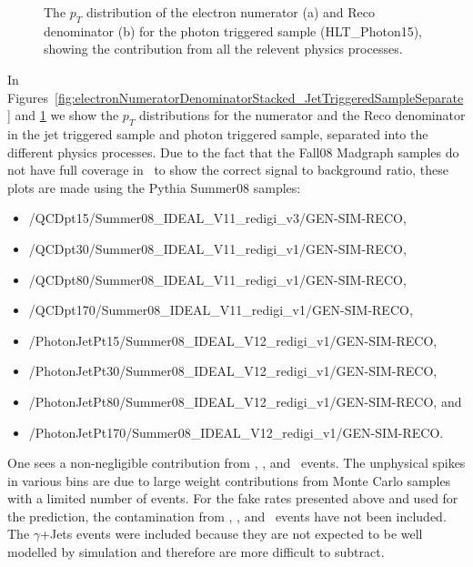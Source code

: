 \documentclass{cmspaper}
\begin{document}
\begin{figure}[htb]
  \begin{center}
    
    \caption{The $p_T$ distribution of the electron numerator (a) and Reco denominator (b) for the photon triggered sample (HLT\_Photon15), showing the contribution from all the relevent physics processes.}
    \label{fig:electronNumeratorDenominatorStacked_PhotonTriggeredSampleSeparate}
  \end{center}
\end{figure}

In Figures~\ref{fig:electronNumeratorDenominatorStacked_JetTriggeredSampleSeparate} and \ref{fig:electronNumeratorDenominatorStacked_PhotonTriggeredSampleSeparate} we show the $p_T$ distributions for the numerator and the Reco denominator in the jet triggered sample and photon triggered sample, separated into the different physics processes. Due to the fact that the Fall08 Madgraph samples do not have full coverage in \ptHat~to show the correct signal to background ratio, these plots are made using the Pythia Summer08 samples:

\begin{itemize}
\item /QCDpt15/Summer08\_IDEAL\_V11\_redigi\_v3/GEN-SIM-RECO,
\item /QCDpt30/Summer08\_IDEAL\_V11\_redigi\_v1/GEN-SIM-RECO,
\item /QCDpt80/Summer08\_IDEAL\_V11\_redigi\_v1/GEN-SIM-RECO,
\item /QCDpt170/Summer08\_IDEAL\_V11\_redigi\_v1/GEN-SIM-RECO,
\item /PhotonJetPt15/Summer08\_IDEAL\_V12\_redigi\_v1/GEN-SIM-RECO,
\item /PhotonJetPt30/Summer08\_IDEAL\_V12\_redigi\_v1/GEN-SIM-RECO,
\item /PhotonJetPt80/Summer08\_IDEAL\_V12\_redigi\_v1/GEN-SIM-RECO, and
\item /PhotonJetPt170/Summer08\_IDEAL\_V12\_redigi\_v1/GEN-SIM-RECO.
\end{itemize}

One sees a non-negligible contribution from \WPM, \Z, and \TTBAR\ events. The unphysical spikes in various bins are due to large weight contributions from Monte Carlo samples with a limited number of events. For the fake rates presented above and used for the prediction, the contamination from \WPM, \Z, and \TTBAR\ events have not been included. The $\gamma$+Jets events were included because they are not expected to be well modelled by simulation and therefore are more difficult to subtract.
\end{document}
